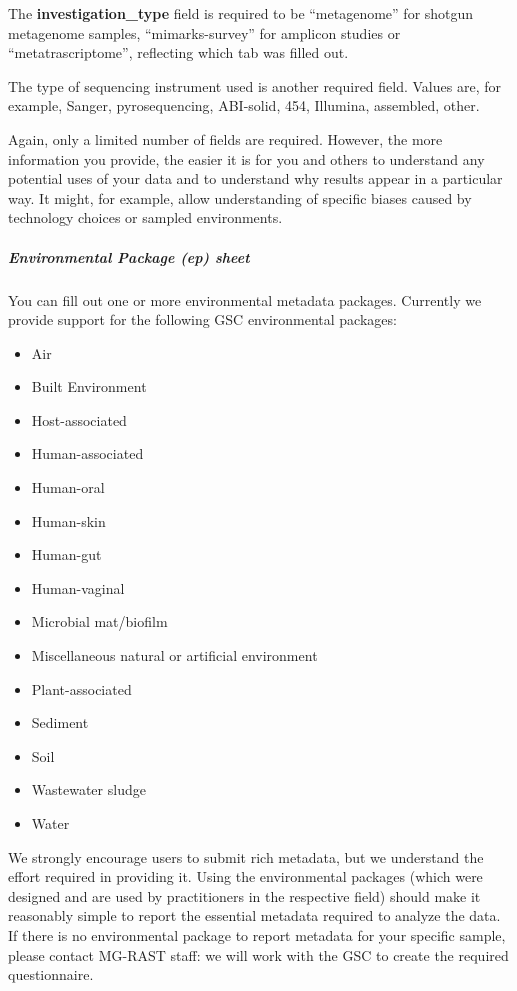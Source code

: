 \documentclass[12pt,fullpage]{report}
\begin{document}
The \textbf{investigation\_type} field is required to be ``metagenome'' for shotgun metagenome samples, ``mimarks-survey'' for amplicon studies or ``metatrascriptome'', reflecting which tab was filled out.

The type of sequencing instrument used is another required field. Values are, for example, Sanger, pyrosequencing, ABI-solid, 454, Illumina, assembled, other.

Again, only a limited number of fields are required. However, the more information you provide, the easier it is for you and others to understand any potential uses of your data and to understand why results appear in a particular way. It might, for example, allow understanding of specific biases caused by technology choices or sampled environments.

\subparagraph*{Environmental Package (ep) sheet}
You can fill out one or more environmental metadata packages.  Currently we provide support for the following GSC environmental packages:

\begin{itemize}\addtolength{\itemsep}{-.55\baselineskip}
\item Air
\item Built Environment
\item Host-associated
\item Human-associated
\item Human-oral
\item Human-skin
\item Human-gut
\item Human-vaginal
\item Microbial mat/biofilm
\item Miscellaneous natural or artificial environment
\item Plant-associated
\item Sediment
\item Soil
\item Wastewater sludge
\item Water
\end{itemize}

We strongly encourage users to submit rich metadata, but we understand the effort required in providing it. Using the environmental packages (which were designed and are used by practitioners in the respective field) should make it reasonably simple to report the essential metadata required to analyze the data. If there is no environmental package to report metadata for your specific sample, please contact MG-RAST staff: we will work with the GSC\cite{GSC} to create the required questionnaire.
\end{document}
